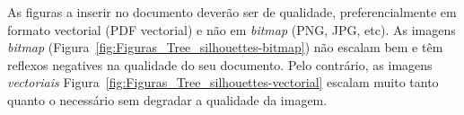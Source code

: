 \egroup



As figuras a inserir no documento deverão ser de qualidade, preferencialmente em formato vectorial (PDF vectorial) e não em \emph{bitmap} (PNG, JPG, etc). As imagens \emph{bitmap} (Figura~\ref{fig:Figuras_Tree_silhouettes-bitmap}) não escalam bem e têm reflexos negatives na qualidade do seu documento.  Pelo contrário, as imagens \emph{vectoriais} {Figura~\ref{fig:Figuras_Tree_silhouettes-vectorial}} escalam muito tanto quanto o necessário sem degradar a qualidade da imagem.

